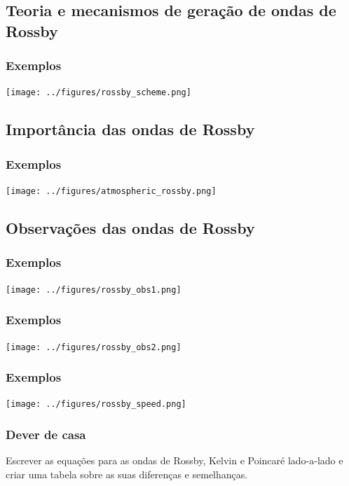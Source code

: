 \subsection{Teoria e mecanismos de geração de ondas de Rossby}
\begin{frame}
  \frametitle{Exemplos}
    \begin{center}
    \texttt{[image: ../figures/rossby\_scheme.png]}
  \end{center}
\end{frame}

\subsection{Importância das ondas de Rossby}
\begin{frame}
  \frametitle{Exemplos}
    \begin{center}
    \texttt{[image: ../figures/atmospheric\_rossby.png]}
  \end{center}
\end{frame}

\subsection{Observações das ondas de Rossby}
\begin{frame}
  \frametitle{Exemplos}
    \begin{center}
    \texttt{[image: ../figures/rossby\_obs1.png]}
  \end{center}
\end{frame}

\begin{frame}
  \frametitle{Exemplos}
    \begin{center}
    \texttt{[image: ../figures/rossby\_obs2.png]}
  \end{center}
\end{frame}


\begin{frame}
  \frametitle{Exemplos}
    \begin{center}
    \texttt{[image: ../figures/rossby\_speed.png]}
  \end{center}
\end{frame}


\begin{frame}
\frametitle{Dever de casa}
    Escrever as equações para as ondas de Rossby, Kelvin e Poincaré lado-a-lado e criar uma
    tabela sobre as suas diferenças e semelhanças.
\end{frame}


